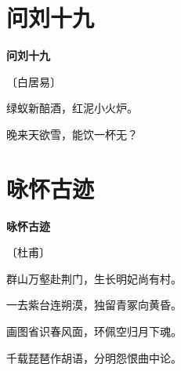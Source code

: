 \documentclass[12pt,UTF-8,openany,fontset=none]{ctexbook}
\begin{document}
\section{问刘十九}


\begin{center}
    {\bfseries 问刘十九}

    \vspace{18pt}

    \begin{large}\xuwen
        〔白居易〕
    \end{large}

\end{center}

    \vspace{18pt}

\begin{center}
    \begin{Large}

        绿蚁新醅酒，红泥小火炉。

        晚来天欲雪，能饮一杯无？

    \end{Large}

\end{center}

\vspace{8pt}
\clearpage

\section{咏怀古迹}


\begin{center}
    {\bfseries 咏怀古迹}

    \vspace{18pt}

    \begin{large}\xuwen
        〔杜甫〕
    \end{large}

\end{center}

    \vspace{18pt}

\begin{center}
    \begin{Large}

        群山万壑赴荆门，生长明妃尚有村。

        一去紫台连朔漠，独留青冢向黄昏。

        画图省识春风面，环佩空归月下魂。

        千载琵琶作胡语，分明怨恨曲中论。

    \end{Large}

\end{center}
\end{document}
